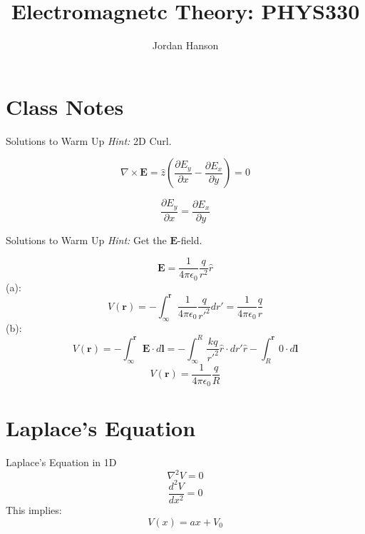 \documentclass{beamer}
\title{Electromagnetc Theory: PHYS330}
\author{Jordan Hanson}
\institute{Whittier College Department of Physics and Astronomy}
\begin{document}
\maketitle

\section{Class Notes}

\begin{frame}{Solutions to Warm Up}
\textit{Hint:} 2D Curl.

\begin{equation}
\nabla \times \mathbf{E} = \hat{z} \left( \frac{\partial E_y}{\partial x} - \frac{\partial E_x}{\partial y} \right) = 0
\end{equation}

\begin{equation}
\frac{\partial E_y}{\partial x} = \frac{\partial E_x}{\partial y}
\end{equation}

\end{frame}

\begin{frame}{Solutions to Warm Up}
\textit{Hint:} Get the $\mathbf{E}$-field.

\begin{equation}
\mathbf{E} = \frac{1}{4\pi\epsilon_0} \frac{q}{r^2} \hat{r}
\end{equation}
(a):
\begin{equation}
V(\mathbf{r}) = - \int_{\infty}^{\mathbf{r}} \frac{1}{4\pi\epsilon_0} \frac{q}{r'^2} dr' = \frac{1}{4\pi\epsilon_0} \frac{q}{r}
\end{equation}
(b):
\begin{equation}
V(\mathbf{r}) = - \int_{\infty}^{\mathbf{r}} \mathbf{E} \cdot d\mathbf{l} = - \int_{\infty}^{R} \frac{k q}{r'^2} \hat{r} \cdot dr' \hat{r} - \int_{R}^{\mathbf{r}} 0 \cdot d\mathbf{l}
\end{equation}
\begin{equation}
V(\mathbf{r}) = \frac{1}{4\pi\epsilon_0} \frac{q}{R}
\end{equation}
\end{frame}

\section{Laplace's Equation}

\begin{frame}{Laplace's Equation in 1D}
\begin{equation}
\nabla^2 V = 0
\end{equation}
\begin{equation}
\frac{d^2V}{dx^2} = 0
\end{equation}
This implies:
\begin{equation}
V(x) = a x + V_0
\end{equation}
\end{frame}
\end{document}
